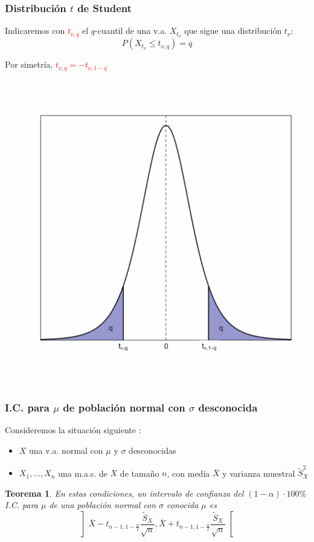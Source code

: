 \documentclass[12pt,t]{beamer}
\newcommand{\red}[1]{\textcolor{red}{#1}}
\renewcommand{\leq}{\leqslant}
\theoremstyle{plain}
\newtheorem{teorema}{Teorema}
\theoremstyle{definition}
\begin{document}
\begin{frame}
\frametitle{Distribución $t$ de Student}

Indicaremos con
\red{$t_{\nu,q}$} el  $q$-cuantil de una  v.a.  $X_{t_{\nu}}$ que sigue una distribución $t_\nu$:
$$
P(X_{t_{\nu}}\leq t_{\nu,q})=q
$$

Por simetría,
\red{$t_{\nu,q}=-t_{\nu,1-q}$}
\vspace*{-1ex}

\begin{center}
\includegraphics[width=0.6\linewidth]{quantilt}
\end{center}
\end{frame}



\begin{frame}
\frametitle{I.C. para $\mu$ de población normal con $\sigma$ desconocida}

Consideremos  la situación siguiente  :
\begin{itemize}
\item  $X$ una v.a.  normal con $\mu$ y $\sigma$ desconocidas

\item $X_1,\ldots,X_n$ una m.a.s. de $X$  de  tamaño  $n$, con media   $\overline{X}$ y varianza muestral $\widetilde{S}_X^2$
\end{itemize}


\begin{teorema}
En estas  condiciones, un intervalo  de confianza  del $(1-\alpha)\cdot 100\%$ I.C. para $\mu$ de una población normal con $\sigma$ conocida $\mu$
es 
$$
\left] 
\overline{X}-t_{n-1,1-\frac{\alpha}{2}} \frac{\widetilde{S}_{X}}{\sqrt{n}},
\overline{X}+t_{n-1,1-\frac{\alpha}{2}}\frac{\widetilde{S}_{X}}{\sqrt{n}} \right[
$$
\end{teorema}

\end{frame}
\end{document}
